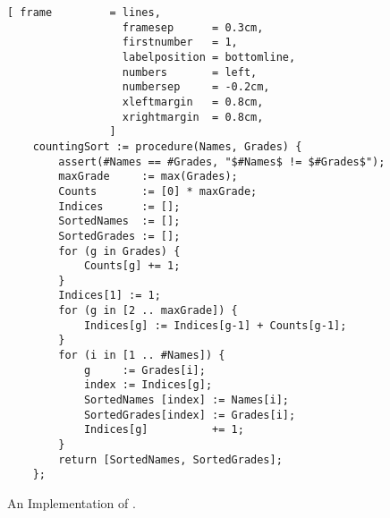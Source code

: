 \begin{figure}[!ht]
\centering
\begin{Verbatim}[ frame         = lines, 
                  framesep      = 0.3cm, 
                  firstnumber   = 1,
                  labelposition = bottomline,
                  numbers       = left,
                  numbersep     = -0.2cm,
                  xleftmargin   = 0.8cm,
                  xrightmargin  = 0.8cm,
                ]
    countingSort := procedure(Names, Grades) {
        assert(#Names == #Grades, "$#Names$ != $#Grades$");
        maxGrade     := max(Grades);
        Counts       := [0] * maxGrade;
        Indices      := [];
        SortedNames  := [];
        SortedGrades := [];
        for (g in Grades) {
            Counts[g] += 1;
        }
        Indices[1] := 1;
        for (g in [2 .. maxGrade]) {
            Indices[g] := Indices[g-1] + Counts[g-1];
        }
        for (i in [1 .. #Names]) {
            g     := Grades[i];
            index := Indices[g];
            SortedNames [index] := Names[i];
            SortedGrades[index] := Grades[i];
            Indices[g]          += 1;
        }
        return [SortedNames, SortedGrades];
    };
\end{Verbatim}
\vspace*{-0.3cm}
\caption{An Implementation of .}
\label{fig:counting-sort.stlx}
\end{figure}

